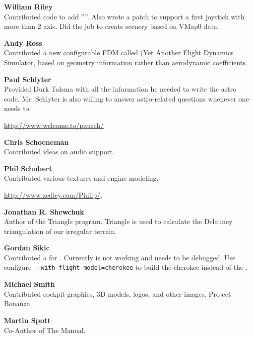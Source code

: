 \noindent \textbf{William Riley}\\
  Contributed code to add ''''. Also wrote a patch to support a first  joystick with more than 2 axis. Did the job to create scenery based on VMap0 data.
 \medskip

\noindent \textbf{Andy Ross}\\
 Contributed a new configurable FDM called \YASim{} (Yet Another Flight Dynamics Simulator, based on geometry information rather than aerodynamic coefficients.
 \medskip

\noindent \textbf{Paul Schlyter}\\
  Provided Durk Talsma with all the information he needed to write the
  astro code. Mr. Schlyter is also willing to answer astro-related questions
  whenever one needs to.
  \medskip

  \href{http://www.welcome.to/pausch/}{http://www.welcome.to/pausch/}
 \medskip

\noindent \textbf{Chris Schoeneman}\\
  Contributed ideas on audio support.
 \medskip

\noindent \textbf{Phil Schubert}\\
  Contributed various textures and engine modeling.
   \medskip

  \href{http://www.zedley.com/Philip/}{http://www.zedley.com/Philip/}.
  \medskip

 \noindent \textbf{Jonathan R. Shewchuk}\\
  Author of the Triangle program.  Triangle
  is used to calculate the  Delauney triangulation of our irregular terrain.
 \medskip

\noindent \textbf{Gordan Sikic}\\
  Contributed a  for .  Currently is not
  working and needs to be debugged.  Use configure
  \texttt{-$ $-with-flight-model=cherokee}
  to build the cherokee instead of the .
 \medskip

\noindent \textbf{Michael Smith}\\
  Contributed cockpit graphics, 3D models, logos, and other images.
  Project Bonanza
   \medskip

\noindent \textbf{Martin Spott}\\
  Co-Author of The Manual.
  \medskip

